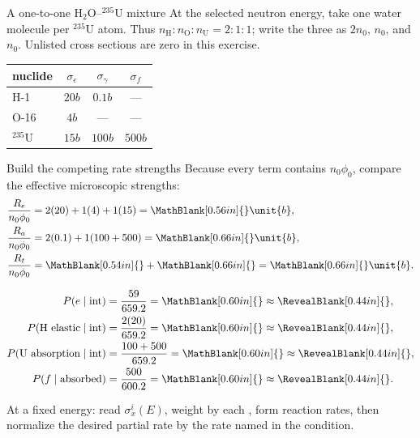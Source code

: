 \begin{handoutcolumns}
\switchcolumn


\begin{fixedbox}{A one-to-one $\mathrm{H_2O}$--${}^{235}\mathrm{U}$ mixture}
At the selected neutron energy, take one water molecule per ${}^{235}$U atom.
Thus $n_{\mathrm H}:n_{\mathrm O}:n_{\mathrm U}=2:1:1$; write the three as
$2n_0$, $n_0$, and $n_0$. Unlisted cross sections are zero in this exercise.

\smallskip
\centering\scriptsize
\begin{tabular}{@{}lccc@{}}
\toprule
nuclide & $\sigma_e$ & $\sigma_\gamma$ & $\sigma_f$ \\
\midrule
H-1 & $20\unit{b}$ & $0.1\unit{b}$ & --- \\
O-16 & $4\unit{b}$ & --- & --- \\
${}^{235}$U & $15\unit{b}$ & $100\unit{b}$ & $500\unit{b}$ \\
\bottomrule
\end{tabular}
\normalsize
\end{fixedbox}

\begin{boardbox}{Build the competing rate strengths}
Because every term contains $n_0\phi_0$, compare the effective microscopic
strengths:
\footnotesize
\begin{align*}
 \frac{R_e}{n_0\phi_0}
   &=2(20)+1(4)+1(15)=\MathBlank[0.56in]{}\unit{b},\\
 \frac{R_a}{n_0\phi_0}
   &=2(0.1)+1(100+500)=\MathBlank[0.66in]{}\unit{b},\\
 \frac{R_t}{n_0\phi_0}
   &=\MathBlank[0.54in]{}+\MathBlank[0.66in]{}
     =\MathBlank[0.66in]{}\unit{b}.
\end{align*}
\normalsize
\end{boardbox}

\begin{checkpoint}
\footnotesize
\begin{align*}
 P(e\mid\mathrm{int})
   &=\frac{59}{659.2}=\MathBlank[0.60in]{}\approx\RevealBlank[0.44in]{},\\
 P(\mathrm{H\ elastic}\mid\mathrm{int})
   &=\frac{2(20)}{659.2}=\MathBlank[0.60in]{}\approx\RevealBlank[0.44in]{},\\
 P(\mathrm{U\ absorption}\mid\mathrm{int})
   &=\frac{100+500}{659.2}=\MathBlank[0.60in]{}\approx\RevealBlank[0.44in]{},\\
 P(f\mid\mathrm{absorbed})
   &=\frac{500}{600.2}=\MathBlank[0.60in]{}\approx\RevealBlank[0.44in]{}.
\end{align*}
\normalsize
\end{checkpoint}

\begin{takeawaybox}
At a fixed energy: read $\sigma_x^i(E)$, weight by each
\RevealBlank[1.08in]{}, form reaction rates, then normalize
the desired partial rate by the rate named in the condition.
\end{takeawaybox}

\end{handoutcolumns}

